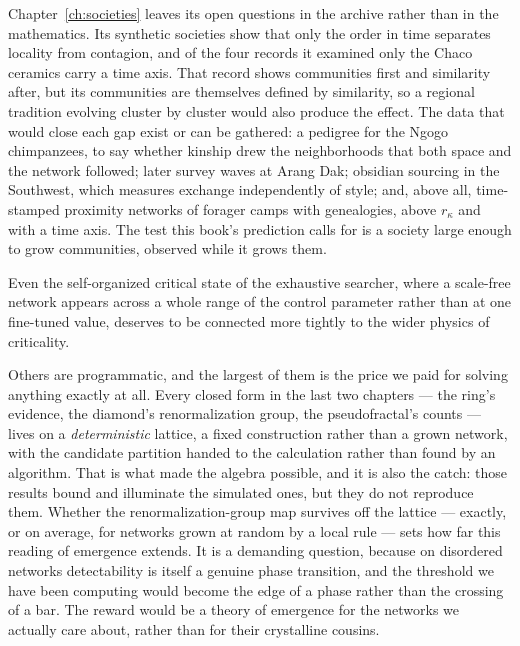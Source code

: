 Chapter~\ref{ch:societies} leaves its open questions in the archive rather than in the
mathematics. Its synthetic societies show that only the order in time separates locality
from contagion, and of the four records it examined only the Chaco ceramics carry a time
axis. That record shows communities first and similarity after, but its communities are
themselves defined by similarity, so a regional tradition evolving cluster by cluster
would also produce the effect. The data that would close each gap exist or can be
gathered: a pedigree for the Ngogo chimpanzees, to say whether kinship drew the
neighborhoods that both space and the network followed; later survey waves at Arang Dak;
obsidian sourcing in the Southwest, which measures exchange independently of style; and,
above all, time-stamped proximity networks of forager camps with genealogies, above
$r_\kappa$ and with a time axis. The test this book's prediction calls for is a society
large enough to grow communities, observed while it grows them.

Even the self-organized critical state of the exhaustive searcher, where a
scale-free network appears across a whole range of the control parameter rather
than at one fine-tuned value, deserves to be connected more tightly to the wider
physics of criticality.

Others are programmatic, and the largest of them is the price we paid for solving
anything exactly at all. Every closed form in the last two chapters --- the ring's
evidence, the diamond's renormalization group, the pseudofractal's counts --- lives
on a \emph{deterministic} lattice, a fixed construction rather than a grown
network, with the candidate partition handed to the calculation rather than found
by an algorithm. That is what made the algebra possible, and it is also the
catch: those results bound and illuminate the simulated ones, but they do not
reproduce them. Whether the renormalization-group map survives off the lattice ---
exactly, or on average, for networks grown at random by a local rule --- sets how
far this reading of emergence extends. It is a demanding question, because on
disordered networks detectability is itself a genuine phase transition, and the
threshold we have been computing would become the edge of a phase rather than the
crossing of a bar. The reward would be a theory of emergence for the networks we
actually care about, rather than for their crystalline cousins.

